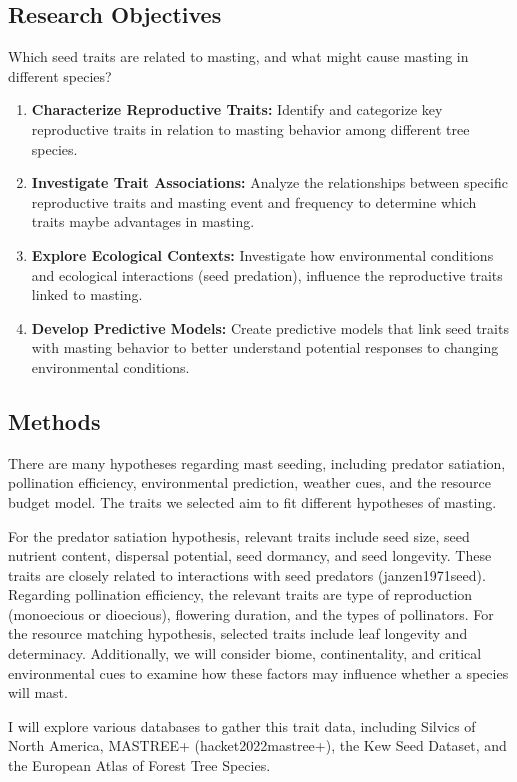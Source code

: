 \documentclass[11pt,letter]{article}
\begin{document}
\subsection{Research Objectives}
Which seed traits are related to masting, and what might cause masting in different species?
	\begin{enumerate}
	\item \textbf{Characterize Reproductive Traits:} Identify and categorize key reproductive traits in relation to masting behavior among different tree species.
	\item \textbf{Investigate Trait Associations:} Analyze the relationships between specific reproductive traits and masting event and frequency to determine which traits maybe advantages in masting.
	\item \textbf{Explore Ecological Contexts:} Investigate how environmental conditions and ecological interactions (seed predation), influence the reproductive traits linked to masting.
	\item \textbf{Develop Predictive Models:} Create predictive models that link seed traits with masting behavior to better understand potential responses to changing environmental conditions.
	\end{enumerate}
\subsection{Methods}
There are many hypotheses regarding mast seeding, including predator satiation, pollination efficiency, environmental prediction, weather cues, and the resource budget model. The traits we selected aim to fit different hypotheses of masting.

For the predator satiation hypothesis, relevant traits include seed size, seed nutrient content, dispersal potential, seed dormancy, and seed longevity. These traits are closely related to interactions with seed predators (janzen1971seed). Regarding pollination efficiency, the relevant traits are type of reproduction (monoecious or dioecious), flowering duration, and the types of pollinators. For the resource matching hypothesis, selected traits include leaf longevity and determinacy. Additionally, we will consider biome, continentality, and critical environmental cues to examine how these factors may influence whether a species will mast.

I will explore various databases to gather this trait data, including Silvics of North America, MASTREE+ (hacket2022mastree+), the Kew Seed Dataset, and the European Atlas of Forest Tree Species.
\end{document}
